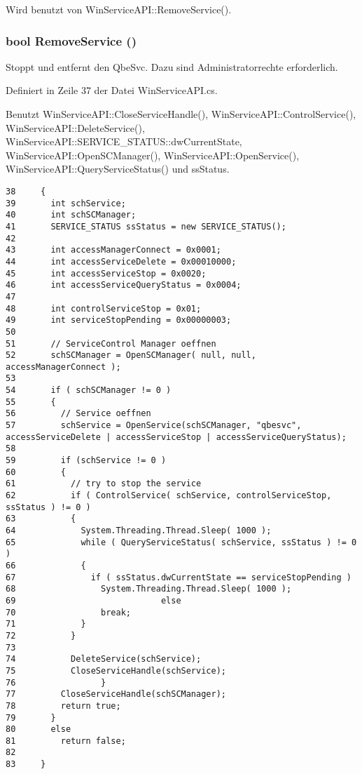 Wird benutzt von Win\-Service\-API::Remove\-Service().\hypertarget{classQbeSAS_1_1WinServiceAPI_QbeSAS_1_1WinServiceAPIe0}{
\subsubsection[RemoveService]{\setlength{\rightskip}{0pt plus 5cm}bool Remove\-Service ()}}
\label{classQbeSAS_1_1WinServiceAPI_QbeSAS_1_1WinServiceAPIe0}


Stoppt und entfernt den Qbe\-Svc. Dazu sind Administratorrechte erforderlich. 

Definiert in Zeile 37 der Datei Win\-Service\-API.cs.

Benutzt Win\-Service\-API::Close\-Service\-Handle(), Win\-Service\-API::Control\-Service(), Win\-Service\-API::Delete\-Service(), Win\-Service\-API::SERVICE\_\-STATUS::dw\-Current\-State, Win\-Service\-API::Open\-SCManager(), Win\-Service\-API::Open\-Service(), Win\-Service\-API::Query\-Service\-Status() und ss\-Status.



\footnotesize\begin{verbatim}38     {
39       int schService;
40       int schSCManager;
41       SERVICE_STATUS ssStatus = new SERVICE_STATUS();
42 
43       int accessManagerConnect = 0x0001;
44       int accessServiceDelete = 0x00010000;
45       int accessServiceStop = 0x0020;
46       int accessServiceQueryStatus = 0x0004;
47 
48       int controlServiceStop = 0x01;
49       int serviceStopPending = 0x00000003;
50 
51       // ServiceControl Manager oeffnen
52       schSCManager = OpenSCManager( null, null, accessManagerConnect );
53 
54       if ( schSCManager != 0 )
55       {
56         // Service oeffnen
57         schService = OpenService(schSCManager, "qbesvc", accessServiceDelete | accessServiceStop | accessServiceQueryStatus);
58 
59         if (schService != 0 )
60         {
61           // try to stop the service
62           if ( ControlService( schService, controlServiceStop, ssStatus ) != 0 )
63           {
64             System.Threading.Thread.Sleep( 1000 );
65             while ( QueryServiceStatus( schService, ssStatus ) != 0 )
66             {
67               if ( ssStatus.dwCurrentState == serviceStopPending )
68                 System.Threading.Thread.Sleep( 1000 );
69                             else
70                 break;
71             }
72           }
73 
74           DeleteService(schService);
75           CloseServiceHandle(schService);
76                 }
77         CloseServiceHandle(schSCManager);
78         return true;
79       } 
80       else 
81         return false;
82 
83     }
\end{verbatim}\normalsize 
